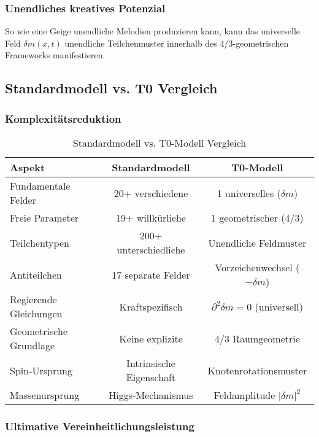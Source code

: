 \documentclass[12pt,a4paper]{article}
\newcommand{\deltafield}{\ensuremath{\delta m}}
\begin{document}
	\subsubsection{Unendliches kreatives Potenzial}
	\label{subsubsec:unendliches_potenzial}
	
	So wie eine Geige unendliche Melodien produzieren kann, kann das universelle Feld $\deltafield(x,t)$ unendliche Teilchenmuster innerhalb des 4/3-geometrischen Frameworks manifestieren.
	
	\subsection{Standardmodell vs. T0 Vergleich}
	\label{subsec:sm_vs_t0}
	
	\subsubsection{Komplexitätsreduktion}
	\label{subsubsec:komplexitaetsreduktion}
	
	\begin{table}[htbp]
		\centering
		\begin{tabular}{lcc}
			\toprule
			\textbf{Aspekt} & \textbf{Standardmodell} & \textbf{T0-Modell} \\
			\midrule
			Fundamentale Felder & 20+ verschiedene & 1 universelles ($\deltafield$) \\
			Freie Parameter & 19+ willkürliche & 1 geometrischer (4/3) \\
			Teilchentypen & 200+ unterschiedliche & Unendliche Feldmuster \\
			Antiteilchen & 17 separate Felder & Vorzeichenwechsel ($-\deltafield$) \\
			Regierende Gleichungen & Kraftspezifisch & $\partial^2\deltafield = 0$ (universell) \\
			Geometrische Grundlage & Keine explizite & 4/3 Raumgeometrie \\
			Spin-Ursprung & Intrinsische Eigenschaft & Knotenrotationsmuster \\
			Massenursprung & Higgs-Mechanismus & Feldamplitude $|\deltafield|^2$ \\
			\bottomrule
		\end{tabular}
		\caption{Standardmodell vs. T0-Modell Vergleich}
		\label{tab:detaillierter_vergleich}
	\end{table}
	
	\subsubsection{Ultimative Vereinheitlichungsleistung}
	\label{subsubsec:ultimative_vereinheitlichung}
	
\end{document}
